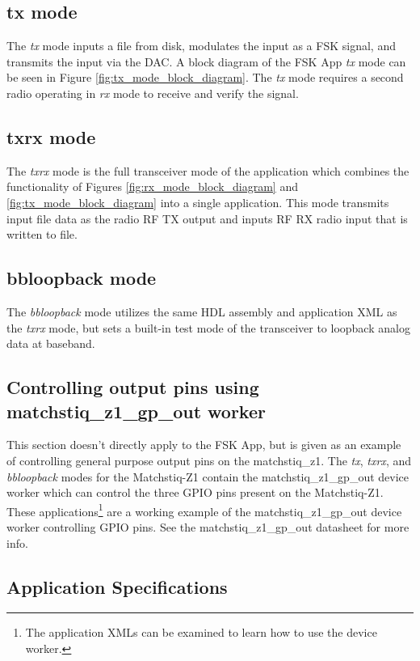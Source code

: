 \newpage\subsection{tx mode}
The \textit{tx} mode inputs a file from disk, modulates the input as a FSK signal, and transmits the input via the DAC.
A block diagram of the FSK App \textit{tx} mode can be seen in Figure \ref{fig:tx_mode_block_diagram}.
The \textit{tx} mode requires a second radio operating in \textit{rx} mode to receive and verify the signal.

\newpage\subsection{txrx mode}
The \textit{txrx} mode is the full transceiver mode of the application which combines the functionality of Figures \ref{fig:rx_mode_block_diagram} and \ref{fig:tx_mode_block_diagram} into a single application.
This mode transmits input file data as the radio RF TX output and inputs RF RX radio input that is written to file.
\subsection{bbloopback mode}
The \textit{bbloopback} mode utilizes the same HDL assembly and application XML as the \textit{txrx} mode, but sets a built-in test mode of the transceiver to loopback analog data at baseband.\par\medskip
\subsection{Controlling output pins using matchstiq\_z1\_gp\_out worker}
This section doesn't directly apply to the FSK App, but is given as an example of controlling general purpose output pins on the matchstiq\_z1.
The \textit{tx}, \textit{txrx}, and \textit{bbloopback} modes for the Matchstiq-Z1 contain the matchstiq\_z1\_gp\_out device worker which can control the three GPIO pins present on the Matchstiq-Z1.
These applications\footnote{The application XMLs can be examined to learn how to use the device worker.} are a working example of the matchstiq\_z1\_gp\_out device worker controlling GPIO pins.
See the matchstiq\_z1\_gp\_out datasheet for more info.


\subsection{Application Specifications}
